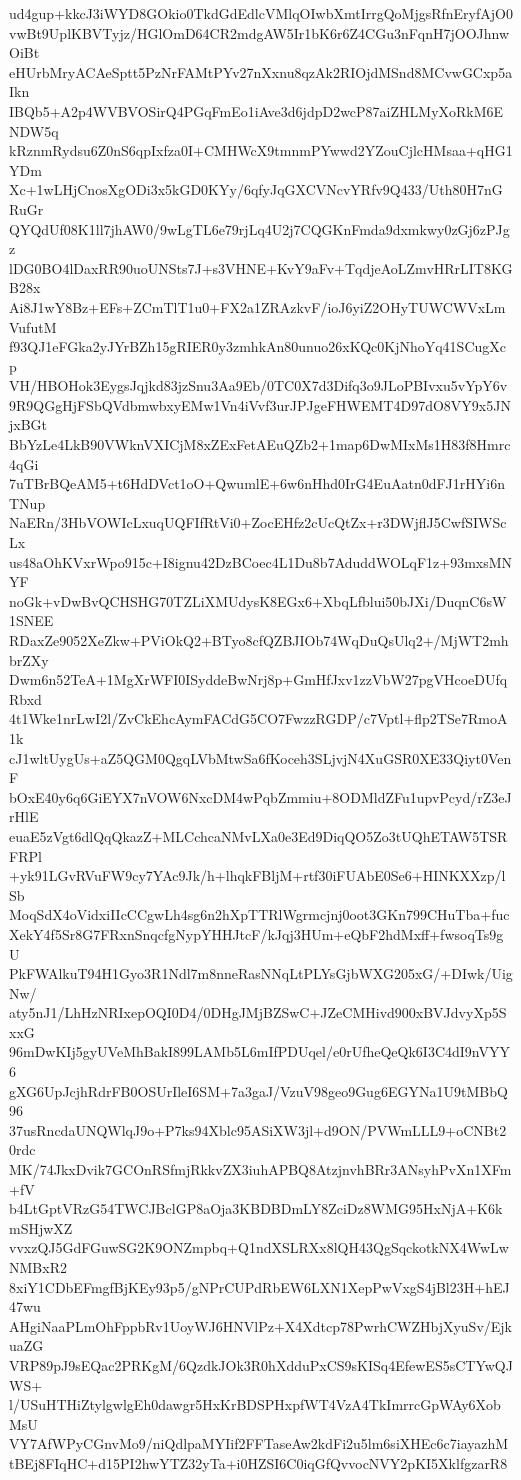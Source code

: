 ud4gup+kkcJ3iWYD8GOkio0TkdGdEdlcVMlqOIwbXmtIrrgQoMjgsRfnEryfAjO0
vwBt9UplKBVTyjz/HGlOmD64CR2mdgAW5Ir1bK6r6Z4CGu3nFqnH7jOOJhnwOiBt
eHUrbMryACAeSptt5PzNrFAMtPYv27nXxnu8qzAk2RIOjdMSnd8MCvwGCxp5aIkn
IBQb5+A2p4WVBVOSirQ4PGqFmEo1iAve3d6jdpD2wcP87aiZHLMyXoRkM6ENDW5q
kRznmRydsu6Z0nS6qpIxfza0I+CMHWcX9tmnmPYwwd2YZouCjlcHMsaa+qHG1YDm
Xc+1wLHjCnosXgODi3x5kGD0KYy/6qfyJqGXCVNcvYRfv9Q433/Uth80H7nGRuGr
QYQdUf08K1ll7jhAW0/9wLgTL6e79rjLq4U2j7CQGKnFmda9dxmkwy0zGj6zPJgz
lDG0BO4lDaxRR90uoUNSts7J+s3VHNE+KvY9aFv+TqdjeAoLZmvHRrLIT8KGB28x
Ai8J1wY8Bz+EFs+ZCmTlT1u0+FX2a1ZRAzkvF/ioJ6yiZ2OHyTUWCWVxLmVufutM
f93QJ1eFGka2yJYrBZh15gRIER0y3zmhkAn80unuo26xKQc0KjNhoYq41SCugXcp
VH/HBOHok3EygsJqjkd83jzSnu3Aa9Eb/0TC0X7d3Difq3o9JLoPBIvxu5vYpY6v
9R9QGgHjFSbQVdbmwbxyEMw1Vn4iVvf3urJPJgeFHWEMT4D97dO8VY9x5JNjxBGt
BbYzLe4LkB90VWknVXICjM8xZExFetAEuQZb2+1map6DwMIxMs1H83f8Hmrc4qGi
7uTBrBQeAM5+t6HdDVct1oO+QwumlE+6w6nHhd0IrG4EuAatn0dFJ1rHYi6nTNup
NaERn/3HbVOWIcLxuqUQFIfRtVi0+ZocEHfz2cUcQtZx+r3DWjflJ5CwfSIWScLx
us48aOhKVxrWpo915c+I8ignu42DzBCoec4L1Du8b7AduddWOLqF1z+93mxsMNYF
noGk+vDwBvQCHSHG70TZLiXMUdysK8EGx6+XbqLfblui50bJXi/DuqnC6sW1SNEE
RDaxZe9052XeZkw+PViOkQ2+BTyo8cfQZBJIOb74WqDuQsUlq2+/MjWT2mhbrZXy
Dwm6n52TeA+1MgXrWFI0ISyddeBwNrj8p+GmHfJxv1zzVbW27pgVHcoeDUfqRbxd
4t1Wke1nrLwI2l/ZvCkEhcAymFACdG5CO7FwzzRGDP/c7Vptl+flp2TSe7RmoA1k
cJ1wltUygUs+aZ5QGM0QgqLVbMtwSa6fKoceh3SLjvjN4XuGSR0XE33Qiyt0VenF
bOxE40y6q6GiEYX7nVOW6NxcDM4wPqbZmmiu+8ODMldZFu1upvPcyd/rZ3eJrHlE
euaE5zVgt6dlQqQkazZ+MLCchcaNMvLXa0e3Ed9DiqQO5Zo3tUQhETAW5TSRFRPl
+yk91LGvRVuFW9cy7YAc9Jk/h+lhqkFBljM+rtf30iFUAbE0Se6+HINKXXzp/lSb
MoqSdX4oVidxiIIcCCgwLh4sg6n2hXpTTRlWgrmcjnj0oot3GKn799CHuTba+fuc
XekY4f5Sr8G7FRxnSnqcfgNypYHHJtcF/kJqj3HUm+eQbF2hdMxff+fwsoqTs9gU
PkFWAlkuT94H1Gyo3R1Ndl7m8nneRasNNqLtPLYsGjbWXG205xG/+DIwk/UigNw/
aty5nJ1/LhHzNRIxepOQI0D4/0DHgJMjBZSwC+JZeCMHivd900xBVJdvyXp5SxxG
96mDwKIj5gyUVeMhBakI899LAMb5L6mIfPDUqel/e0rUfheQeQk6I3C4dI9nVYY6
gXG6UpJcjhRdrFB0OSUrIleI6SM+7a3gaJ/VzuV98geo9Gug6EGYNa1U9tMBbQ96
37usRncdaUNQWlqJ9o+P7ks94Xblc95ASiXW3jl+d9ON/PVWmLLL9+oCNBt20rdc
MK/74JkxDvik7GCOnRSfmjRkkvZX3iuhAPBQ8AtzjnvhBRr3ANsyhPvXn1XFm+fV
b4LtGptVRzG54TWCJBclGP8aOja3KBDBDmLY8ZciDz8WMG95HxNjA+K6kmSHjwXZ
vvxzQJ5GdFGuwSG2K9ONZmpbq+Q1ndXSLRXx8lQH43QgSqckotkNX4WwLwNMBxR2
8xiY1CDbEFmgfBjKEy93p5/gNPrCUPdRbEW6LXN1XepPwVxgS4jBl23H+hEJ47wu
AHgiNaaPLmOhFppbRv1UoyWJ6HNVlPz+X4Xdtcp78PwrhCWZHbjXyuSv/EjkuaZG
VRP89pJ9sEQac2PRKgM/6QzdkJOk3R0hXdduPxCS9sKISq4EfewES5sCTYwQJWS+
l/USuHTHiZtylgwlgEh0dawgr5HxKrBDSPHxpfWT4VzA4TkImrrcGpWAy6XobMsU
VY7AfWPyCGnvMo9/niQdlpaMYIif2FFTaseAw2kdFi2u5lm6siXHEc6c7iayazhM
tBEj8FIqHC+d15PI2hwYTZ32yTa+i0HZSI6C0iqGfQvvocNVY2pKI5XklfgzarR8
